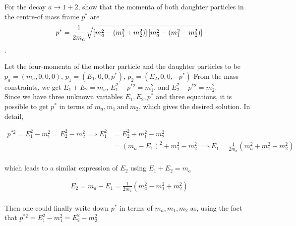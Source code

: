 \begin{problem}{3.2}
For the decay $a \rightarrow 1 + 2$, show that the momenta of both daughter particles
in the centre-of mass frame $p^\ast$ are
$$p^\ast = {1 \over 2m_a}\sqrt{\left[m_a^2 - (m_1^2 + m_2^2)\right]\left[m_a^2 - (m_1^2 - m_2^2)\right]}$$.
\end{problem}
\begin{solution}
Let the four-momenta of the mother particle and the daughter particles to be
$p_a = (m_a, 0, 0, 0)$, $p_1 = (E_1, 0, 0, p^*)$, $p_2 = (E_2, 0, 0, -p^\ast)$
From the mass constraints, we get $E_1 + E_2 = m_a$, $E_1^2 - p^{\ast2} = m_1^2$, and 
$E_2^2 - p^{\ast2} = m_2^2$.\\

Since we have three unknown variables $E_1, E_2, p^*$ and three equations,
it is possible to get $p^*$ in terms of $m_a, m_1 \ \mathrm{and} \ m_2$, which gives
the desired solution. In detail, 

\begin{align*}
    p^{\ast2} = E_1^2 - m_1^2 = E_2^2 - m_2^2 \implies E_1^2 &= E_2^2 + m_1^2 - m_2^2 \\[0.15in]
                                                             &= \left( m_a - E_1\right)^2 + m_1^2 -m_2^2 \implies E_1 = \frac{1}{2m_a}\left( m_a^2 +m_1^2 -m_2^2 \right)
\end{align*}\\
which leads to a similar expression of $E_2$ using $E_1+E_2 = m_a$ 

\begin{align*}
    E_2 = m_a - E_1 = \frac{1}{2m_a}\left( m_a^2 - m_1^2 +m_2^2 \right)
\end{align*}\\
Then one could finally write down $p^\ast$ in terms of $m_a,m_1,m_2$ as, using the fact that $p^{\ast2} = E_1^2 - m_1^2 = E_2^2 - m_2^2$


\end{solution}
